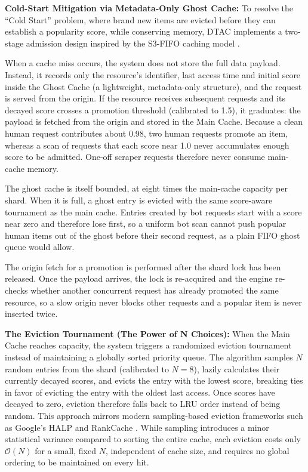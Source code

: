 \textbf{Cold-Start Mitigation via Metadata-Only Ghost Cache:}
To resolve the ``Cold Start'' problem, where brand new items are evicted before they can establish a popularity score, while conserving memory, DTAC implements a two-stage admission design inspired by the S3-FIFO caching model \cite{yang_fifo_2023}.

When a cache miss occurs, the system does not store the full data payload. Instead, it records only the resource's identifier, last access time and initial score inside the Ghost Cache (a lightweight, metadata-only structure), and the request is served from the origin. If the resource receives subsequent requests and its decayed score crosses a promotion threshold (calibrated to 1.5), it graduates: the payload is fetched from the origin and stored in the Main Cache. Because a clean human request contributes about 0.98, two human requests promote an item, whereas a scan of requests that each score near 1.0 never accumulates enough score to be admitted. One-off scraper requests therefore never consume main-cache memory.

The ghost cache is itself bounded, at eight times the main-cache capacity per shard. When it is full, a ghost entry is evicted with the same score-aware tournament as the main cache. Entries created by bot requests start with a score near zero and therefore lose first, so a uniform bot scan cannot push popular human items out of the ghost before their second request, as a plain FIFO ghost queue would allow.

The origin fetch for a promotion is performed after the shard lock has been released. Once the payload arrives, the lock is re-acquired and the engine re-checks whether another concurrent request has already promoted the same resource, so a slow origin never blocks other requests and a popular item is never inserted twice.

\textbf{The Eviction Tournament (The Power of N Choices):}
When the Main Cache reaches capacity, the system triggers a randomized eviction tournament instead of maintaining a globally sorted priority queue. The algorithm samples $N$ random entries from the shard (calibrated to $N = 8$), lazily calculates their currently decayed scores, and evicts the entry with the lowest score, breaking ties in favor of evicting the entry with the oldest last access. Once scores have decayed to zero, eviction therefore falls back to LRU order instead of being random. This approach mirrors modern sampling-based eviction frameworks such as Google's HALP \cite{song_halp_2023} and RankCache \cite{beckmann_lhd_2018}. While sampling introduces a minor statistical variance compared to sorting the entire cache, each eviction costs only $\mathcal{O}(N)$ for a small, fixed $N$, independent of cache size, and requires no global ordering to be maintained on every hit.

